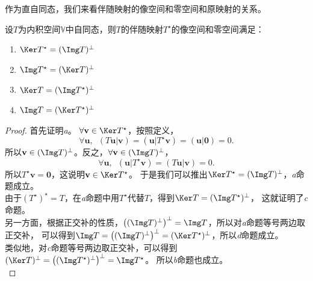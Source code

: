 \documentclass[12pt,UTF8,fontset=none]{ctexbook}
\begin{document}
作为直自同态，我们来看伴随映射的像空间和零空间和原映射的关系。
\begin{pp}\label{pp:8_4}
    设$T$为内积空间$\mathbb{V}$中自同态，则$T$的伴随映射$T^\star$的像空间和零空间满足：
    \begin{enumerate}[label=\alph*.]   
        \item $\Ker T^\star = (\Img T)^\perp$
        \item $\Img T^\star = (\Ker T)^\perp$
        \item $\Ker T = (\Img T^\star)^\perp$
        \item $\Img T = (\Ker T^\star)^\perp$
    \end{enumerate}
\end{pp}
\begin{proof} %
    首先证明\textit{a}。
    $\forall \mathbf{v} \in \Ker T^\star$，按照定义，
    $$ \forall \mathbf{u}, \,\,\,(T\mathbf{u} | \mathbf{v}) = (\mathbf{u} | T^\star\mathbf{v}) = (\mathbf{u} | \mathbf{0}) = 0.  $$
    所以$\mathbf{v} \in (\Img T)^\perp$。反之，$\forall \mathbf{v} \in (\Img T)^\perp$，
    $$ \forall \mathbf{u}, \,\,\, (\mathbf{u} | T^\star\mathbf{v}) = (T\mathbf{u} | \mathbf{v}) = 0.$$
    所以$T^\star\mathbf{v} = \mathbf{0}$，这说明$\mathbf{v} \in \Ker T^\star$。
    于是我们可以推出$\Ker T^\star = (\Img T)^\perp$，\textit{a}命题成立。\\
    由于$ (T^\star)^\star = T $，在\textit{a}命题中用$T^\star$代替$T$，得到$\Ker T = (\Img T^\star)^\perp$，
    这就证明了\textit{c}命题。\\
    另一方面，根据正交补的性质，$\left((\Img T)^\perp\right)^\perp = \Img T$，所以对\textit{a}命题等号两边取正交补，
    可以得到$\Img T = \left((\Img T)^\perp\right)^\perp = (\Ker T^\star)^\perp$，所以\textit{d}命题成立。\\
    类似地，对\textit{c}命题等号两边取正交补，可以得到$(\Ker T)^\perp = \left((\Img T^\star)^\perp\right)^\perp = \Img T^\star$。
    所以\textit{b}命题也成立。\\
\end{proof}
\end{document}
